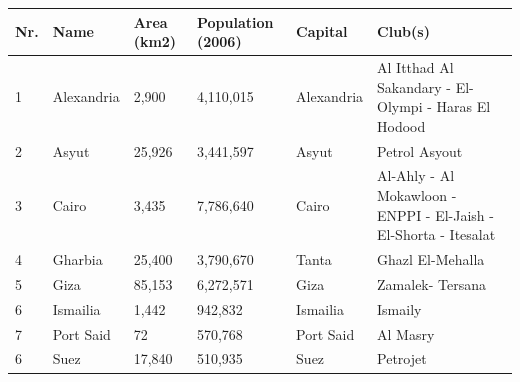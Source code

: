 \documentclass{article}
\begin{document}
\begin{tabular}{llllll}
\toprule
Nr. & Name & Area (km2) & Population (2006) & Capital & Club(s) \\
\midrule
1 & Alexandria & 2,900 & 4,110,015 & Alexandria & Al Itthad Al Sakandary - El-Olympi - Haras El Hodood \\
2 & Asyut & 25,926 & 3,441,597 & Asyut & Petrol Asyout \\
3 & Cairo & 3,435 & 7,786,640 & Cairo & Al-Ahly - Al Mokawloon - ENPPI - El-Jaish - El-Shorta - Itesalat \\
4 & Gharbia & 25,400 & 3,790,670 & Tanta & Ghazl El-Mehalla \\
5 & Giza & 85,153 & 6,272,571 & Giza & Zamalek- Tersana \\
6 & Ismailia & 1,442 & 942,832 & Ismailia & Ismaily \\
7 & Port Said & 72 & 570,768 & Port Said & Al Masry \\
6 & Suez & 17,840 & 510,935 & Suez & Petrojet \\
\bottomrule
\end{tabular}
\end{document}
